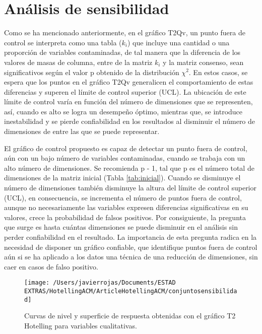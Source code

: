 \documentclass[water,article,submit,moreauthors,pdftex]{mdpi}
\begin{document}
\hypertarget{anuxe1lisis-de-sensibilidad}{%
\section{Análisis de sensibilidad}\label{anuxe1lisis-de-sensibilidad}}

Como se ha mencionado anteriormente, en el gráfico T2Qv, un punto fuera
de control se interpreta como una tabla (\(k_i\)) que incluye una
cantidad o una proporción de variables contaminadas, de tal manera que
la diferencia de los valores de masas de columna, entre de la matriz
\(k_i\) y la matriz consenso, sean significativos según el valor p
obtenido de la distribución \(\chi^2\). En estos casos, se espera que
los puntos en el gráfico T2Qv generalicen el comportamiento de estas
diferencias y superen el límite de control superior (UCL). La ubicación
de este límite de control varía en función del número de dimensiones que
se representen, así, cuando es alto se logra un desempeño óptimo,
mientras que, se introduce inestabilidad y se pierde confiabilidad en
los resultados al disminuir el número de dimensiones de entre las que se
puede representar.

El gráfico de control propuesto es capaz de detectar un punto fuera de
control, aún con un bajo número de variables contaminadas, cuando se
trabaja con un alto número de dimensiones. Se recomienda p - 1, tal que
p es el número total de dimensiones de la matriz inicial (Tabla
\ref{tab:inicial}). Cuando se disminuye el número de dimensiones también
disminuye la altura del límite de control superior (UCL), en
consecuencia, se incrementa el número de puntos fuera de control, aunque
no necesariamente las variables expresen diferencias significativas en
su valores, crece la probabilidad de falsos positivos. Por consiguiente,
la pregunta que surge es hasta cuántas dimensiones se puede disminuir en
el análisis sin perder confiabilidad en el resultado. La importancia de
esta pregunta radica en la necesidad de disponer un gráfico confiable,
que identifique puntos fuera de control aún si se ha aplicado a los
datos una técnica de una reducción de dimensiones, sin caer en casos de
falso positivo.

\begin{figure}[!ht]



\begin{center}\texttt{[image: /Users/javierrojas/Documents/ESTAD EXTRAS/HotellingACM/ArticleHotellingACM/conjuntosensibilidad]} \end{center}

\caption{Curvas de nivel y superficie de respuesta obtenidas con el gráfico T2 Hotelling para variables cualitativas.}

\label{fig:sensibilidad}
\end{figure}
\end{document}
